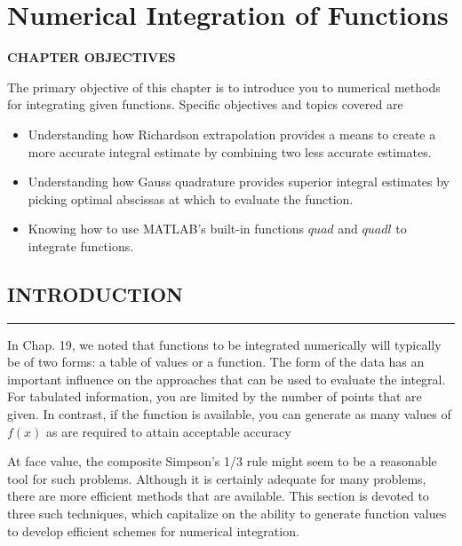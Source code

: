 \documentclass[../main.tex]{subfiles}
\begin{document}
\chapter*{Numerical Integration of Functions}

\vspace{1,5in}

\begin{center}\begin{Large}\textbf{CHAPTER OBJECTIVES}\end{Large}\end{center}

The primary objective of this chapter is to introduce you to numerical methods for
integrating given functions. Specific objectives and topics covered are
\begin{itemize}
\item Understanding how Richardson extrapolation provides a means to create a more
accurate integral estimate by combining two less accurate estimates.
\item Understanding how Gauss quadrature provides superior integral estimates by
picking optimal abscissas at which to evaluate the function.
\item Knowing how to use MATLAB's built-in functions $quad$ and 
$quadl$ to integrate
functions.
\end{itemize}
\vspace{0,6in}
\section{INTRODUCTION}
\vspace{0,1in}
\hrule
\vspace{0,1in}
In Chap. 19, we noted that functions to be integrated numerically will typically be of two
forms: a table of values or a function. The form of the data has an important influence on
the approaches that can be used to evaluate the integral. For tabulated information, you are
limited by the number of points that are given. In contrast, if the function is available, you
can generate as many values of $f (x)$ as are required to attain acceptable accuracy

At face value, the composite Simpson's 1/3 rule might seem to be a reasonable tool for
such problems. Although it is certainly adequate for many problems, there are more efficient methods that are available. This section is devoted to three such techniques, which
capitalize on the ability to generate function values to develop efficient schemes for
numerical integration.
\end{document}
